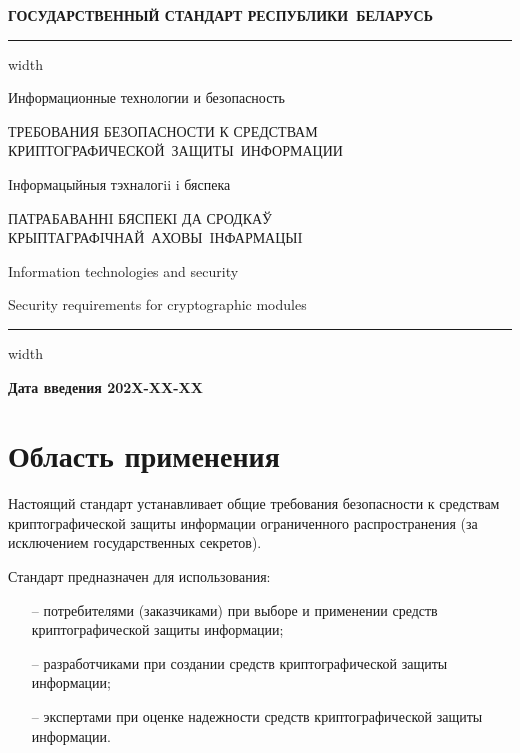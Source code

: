 \newpage
\setcounter{page}{1}
\pagestyle{headings}

\begin{center}
{\bfseries
ГОСУДАРСТВЕННЫЙ СТАНДАРТ РЕСПУБЛИКИ~БЕЛАРУСЬ
\vskip 2pt
\hrule width\textwidth

\vskip 9pt

Информационные технологии и безопасность

ТРЕБОВАНИЯ БЕЗОПАСНОСТИ К СРЕДСТВАМ КРИПТОГРАФИЧЕСКОЙ~ЗАЩИТЫ~ИНФОРМАЦИИ

\vskip 9pt

Iнформацыйныя тэхналогii i бяспека

ПАТРАБАВАННI БЯСПЕКI ДА СРОДКАЎ КРЫПТАГРАФIЧНАЙ~АХОВЫ~IНФАРМАЦЫI
}

\vskip 9pt

Information technologies and security

Security requirements for cryptographic modules

\vskip 4pt                
\hrule width \textwidth
\end{center}

\mbox{}\hfill{\bfseries Дата введения 202X-XX-XX}

\chapter{Область применения}\label{Scope}

Настоящий стандарт устанавливает общие требования безопасности к средствам
криптографической защиты информации ограниченного распространения (за
исключением государственных секретов).

Стандарт предназначен для использования:
\begin{itemize}
\item[--]
потребителями (заказчиками) при выборе и применении средств криптографической
защиты информации;

\item[--]
разработчиками при создании средств криптографической защиты информации;

\item[--]
экспертами при оценке надежности средств криптографической защиты 
информации. 
\end{itemize}


